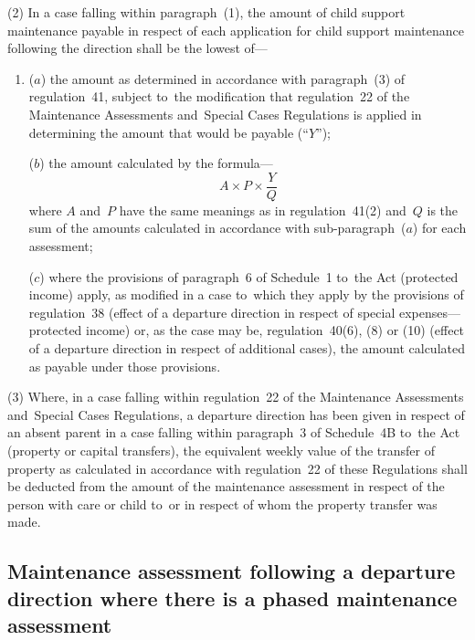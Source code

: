\documentclass[12pt,a4paper]{article}
\begin{document}
(2) In a case falling within paragraph~(1), the amount of child support maintenance payable in respect of each application for child support maintenance following the direction shall be the 
lowest  %
of—
\begin{enumerate}\item[]
($a$) the amount as determined in accordance with paragraph~(3) of regulation~41,
subject to~the modification that regulation~22 of the Maintenance Assessments
and~Special Cases Regulations is applied in determining the amount that would be
payable (“$Y$”);

($b$) the amount calculated by the formula—
\[A \times P \times \frac{Y}{Q}\]
where $A$ and~$P$ have the same meanings as in regulation~41(2) and~$Q$ is the sum of
the amounts calculated in accordance with sub-paragraph~($a$) for each assessment;

($c$) where the provisions of paragraph~6 of Schedule~1 to~the Act (protected income) apply, as modified in a case to~which they apply by the provisions of regulation~38 (effect of a departure direction in respect of special expenses—protected income) or, as the case may be, regulation~40(6), (8) or (10) (effect of a departure direction in respect of additional cases), the amount calculated as payable under those provisions.
\end{enumerate}

(3) Where, in a case falling within regulation~22 of the Maintenance Assessments
and~Special Cases Regulations, a departure direction has been given in respect
of an absent parent in a case falling within paragraph~3 of Schedule~4B to~the
Act (property or capital transfers), the equivalent weekly value of the transfer
of property as calculated in accordance with regulation~22 of these Regulations
shall be deducted from the amount of the maintenance assessment in respect of
the person with care or child to~or in respect of whom the property transfer was
made.


\subsection[44. Maintenance assessment following a departure direction where there is a phased
maintenance assessment]{\sloppy Maintenance assessment following a departure direction where there is a phased
maintenance assessment}
\end{document}
